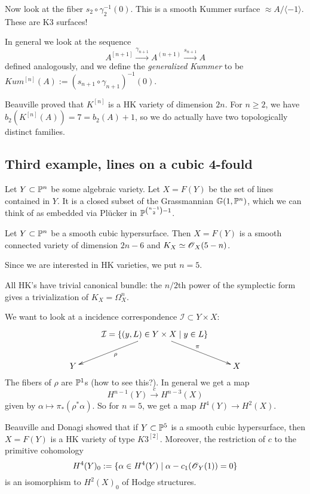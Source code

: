 \documentclass[11pt, english]{article}
\begin{document}
Now look at the fiber $s_2 \circ \gamma_2^{-1}(0)$. This is a smooth Kummer surface $\approx A/ \langle -1 \rangle$. These are K3 surfaces! 

In general we look at the sequence 
$$
A^{[n+1]} \xrightarrow{\gamma_{n+1}} A^{(n+1)} \xrightarrow{s_{n+1}} A
$$
defined analogously, and we define the \emph{generalized Kummer} to be $Kum^{[n]}(A) := (s_{n+1} \circ \gamma_{n+1})^{-1}(0)$.

Beauville proved that $K^{[n]}$ is a HK variety of dimension $2n$. For $n\geq 2$, we have $b_2(K^{[n]}(A)) = 7 = b_2(A) + 1$, so we do actually have two topologically distinct families.

\subsection{Third example, lines on a cubic 4-fould}

Let $Y \subset \mathbb{P}^n$ be some algebraic variety. Let $X = F(Y)$ be the set of lines contained in $Y$. It is a closed subset of the Grassmannian $\mathbb G(1,\mathbb{P}^n)$, which we can think of as embedded via Plücker in $\mathbb{P}^{\binom{n-1}{2}-1}$.

\begin{thm}
Let $Y \subset \mathbb{P}^n$ be a smooth cubic hypersurface. Then $X=F(Y)$ is a smooth connected variety of dimension $2n-6$ and $K_X \simeq \operatorname{\mathscr{O}}_X(5-n)$. 
\end{thm}
Since we are interested in HK varieties, we put $n=5$. 

\begin{remark}
All HK's have trivial canonical bundle: the $n/2$th power of the symplectic form gives a trivialization of $K_X = \Omega^n_X$.
\end{remark}

We want to look at a incidence correspondence $\mathcal I \subset Y \times X$:
$$
\xymatrix{
&\mathcal I = \{ (y,L) \in Y \times X \mid y \in L \} \ar[dl]^\rho \ar[dr]^\pi \\
Y && X
}
$$
The fibers of $\rho$ are $\mathbb{P}^1$s (how to see this?). In general we get a map
$$
H^{n-1}(Y) \xrightarrow{c} H^{n-3}(X)
$$
given by $\alpha \mapsto \pi_\ast(\rho^\ast \alpha)$. So for $n=5$, we get a map $H^4(Y) \to H^2(X)$. 

Beauville and Donagi showed that if $Y\subset \mathbb{P}^5$ is a smooth cubic hypersurface, then $X=F(Y)$ is a HK variety of type $K3^{[2]}$. Moreover, the restriction of $c$ to the primitive cohomology
$$
H^4(Y)_0 := \{ \alpha \in H^4(Y) \mid \alpha - c_1(\operatorname{\mathscr{O}}_Y(1)) = 0 \}
$$
is an isomorphism to $H^2(X)_0$ of Hodge structures.
\end{document}
